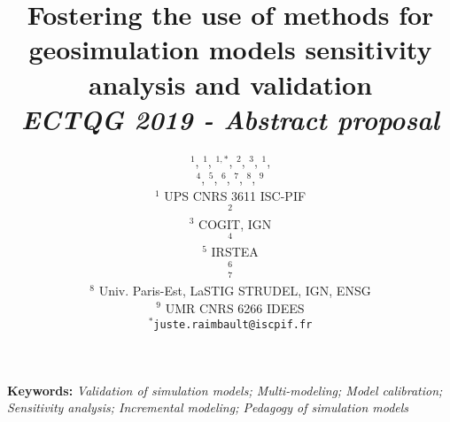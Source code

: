 \documentclass[11pt]{article}
\begin{document}
\title{\vspace{-1cm}Fostering the use of methods for geosimulation models sensitivity analysis and validation
\\\medskip
\textit{ECTQG 2019 - Abstract proposal}
}
\author{$^{1}$, $^{1}$, $^{1,\ast}$, $^2$, $^3$, $^1$,\\
 $^4$, $^5$, $^6$, $^7$, $^8$, $^9$\medskip\\
$^1$ UPS CNRS 3611 ISC-PIF\\
$^2$ \\
$^3$ COGIT, IGN\\
$^4$ \\
$^5$ IRSTEA \\
$^6$ \\
$^7$ \\
$^8$ Univ. Paris-Est, LaSTIG STRUDEL, IGN, ENSG\\
$^9$ UMR CNRS 6266 IDEES
\medskip\\
$^{\ast}$\texttt{juste.raimbault@iscpif.fr}
}
\date{}

\maketitle

\justify



\textbf{Keywords: }\textit{Validation of simulation models; Multi-modeling; Model calibration; Sensitivity analysis; Incremental modeling; Pedagogy of simulation models}

\medskip
\end{document}
